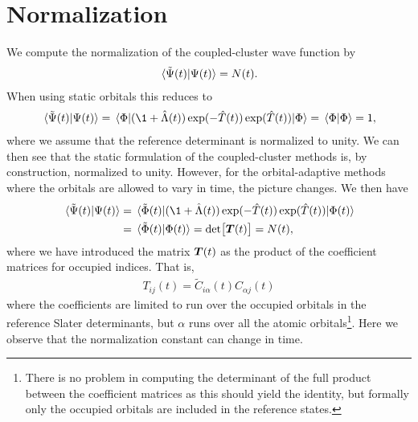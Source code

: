    \section{Normalization}
        We compute the normalization of the coupled-cluster wave function by
        \begin{align}
            \braket*{\tilde{\Psi}(t)}{\Psi(t)} = N(t).
        \end{align}
        When using static orbitals this reduces to
        \begin{align}
            \braket*{\tilde{\Psi}(t)}{\Psi(t)}
            = \mel*{\slat}{
                (\1 + \clustl(t))
                \exponential(-\clust(t))
                \exponential(\clust(t))
            }{\slat}
            = \braket*{\slat}{\slat}
            = 1,
        \end{align}
        where we assume that the reference determinant is normalized to
        unity.
        We can then see that the static formulation of the coupled-cluster
        methods is, by construction, normalized to unity.
        However, for the orbital-adaptive methods where the orbitals are
        allowed to vary in time, the picture changes.
        We then have
        \begin{align}
            \braket*{\tilde{\Psi}(t)}{\Psi(t)}
            &=
            \mel*{\tilde{\slat}(t)}{
                (\1 + \clustl(t))
                \exponential(-\clust(t))
                \exponential(\clust(t))
            }{\slat(t)}
            \\
            &= \braket*{\tilde{\slat}(t)}{\slat(t)}
            = \det[\vfg{T}(t)]
            = N(t),
            \label{eq:norm-oatdcc}
        \end{align}
        where we have introduced the matrix $\boldsymbol{T}(t)$ as the product of
        the coefficient matrices for occupied indices.
        That is,
        \begin{align}
            T_{ij}(t) = \tilde{C}_{i\alpha}(t) C_{\alpha j}(t)
        \end{align}
        where the coefficients are limited to run over the occupied orbitals
        in the reference Slater determinants, but $\alpha$ runs over all the
        atomic orbitals\footnote{%
            There is no problem in computing the determinant of the full
            product between the coefficient matrices as this should yield
            the identity, but formally only the occupied orbitals are
            included in the reference states.
        }.
        Here we observe that the normalization constant can change in time.
